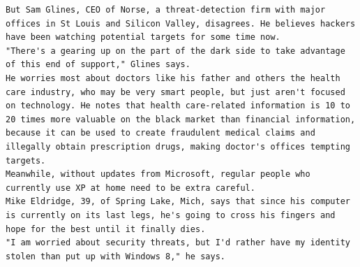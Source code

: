 \documentclass[BTech]{nitgoathesis}
\begin{document}
\begin{lstlisting}[basicstyle=\scriptsize]
But Sam Glines, CEO of Norse, a threat-detection firm with major offices in St Louis and Silicon Valley, disagrees. He believes hackers have been watching potential targets for some time now.
"There's a gearing up on the part of the dark side to take advantage of this end of support," Glines says.
He worries most about doctors like his father and others the health care industry, who may be very smart people, but just aren't focused on technology. He notes that health care-related information is 10 to 20 times more valuable on the black market than financial information, because it can be used to create fraudulent medical claims and illegally obtain prescription drugs, making doctor's offices tempting targets.
Meanwhile, without updates from Microsoft, regular people who currently use XP at home need to be extra careful.
Mike Eldridge, 39, of Spring Lake, Mich, says that since his computer is currently on its last legs, he's going to cross his fingers and hope for the best until it finally dies.
"I am worried about security threats, but I'd rather have my identity stolen than put up with Windows 8," he says.
\end{lstlisting}
\end{document}
